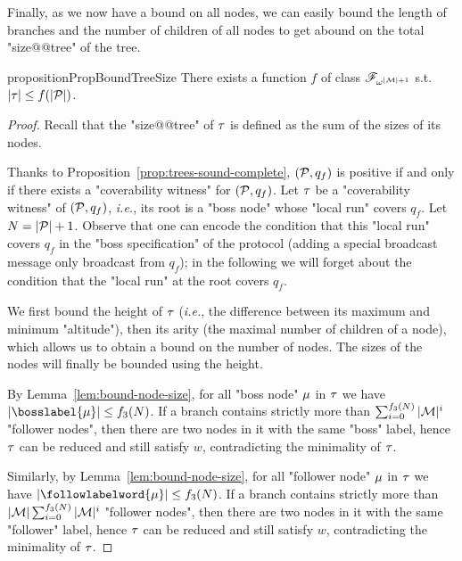 Finally, as we now have a bound on all nodes, we can easily bound the length of branches and the number of children of all nodes to get abound on the total "size@@tree" of the tree.

\begin{restatable}{proposition}{PropBoundTreeSize}
	\label{prop:bound-tree-size}
	There exists a function $f$ of class $\mathscr{F}_{\omega^{|\mathcal{M}|+1}}$ s.t. $|\tau| \leq f(|\mathcal{P}|)$.
\end{restatable}

\begin{proof}
	Recall that the "size@@tree" of $\tau$ is defined as the sum of the sizes of its nodes. 

	Thanks to Proposition~\ref{prop:trees-sound-complete}, $(\mathcal{P},q_f)$ is positive if and only if there exists a "coverability witness" for $(\mathcal{P},q_f)$.
	Let $\tau$ be a "coverability witness" of $(\mathcal{P},q_f)$, \emph{i.e.}, its root is a "boss node" whose "local run" covers $q_f$. Let $N = |\mathcal{P}|+1$. Observe that one can encode the condition that this "local run" covers $q_f$ in the "boss specification" of the protocol (adding a special broadcast message only broadcast from $q_f$); in the following we will forget about the condition that the "local run" at the root covers $q_f$.
	
	We first bound the height of $\tau$ (\emph{i.e.}, the difference between its maximum and minimum "altitude"), then its arity (the maximal number of children of a node), which allows us to obtain a bound on the number of nodes. The sizes of the nodes will finally be bounded using the height. 
	
	By Lemma~\ref{lem:bound-node-size}, for all "boss node" $\mu$ in $\tau$ we have $\size{\bosslabel{\node}} \leq f_3(N)$.
	If a branch contains strictly more than $\sum_{i=0}^{f_3(N)}|\mathcal{M}|^{i}$ "follower nodes", then there are two nodes in it with the same "boss" label, hence $\tau$ can be reduced and still satisfy $w$, contradicting the minimality of $\tau$.

	Similarly, by Lemma~\ref{lem:bound-node-size}, for all "follower node" $\mu$ in $\tau$ we have $\size{\followlabelword{\node}} \leq f_3(N)$.
	If a branch contains strictly more than $|\mathcal{M}| \sum_{i=0}^{f_3(N)}|\mathcal{M}|^{i}$ "follower nodes", then there are two nodes in it with the same "follower" label, hence $\tau$ can be reduced and still satisfy $w$, contradicting the minimality of $\tau$.
	

\end{proof}

